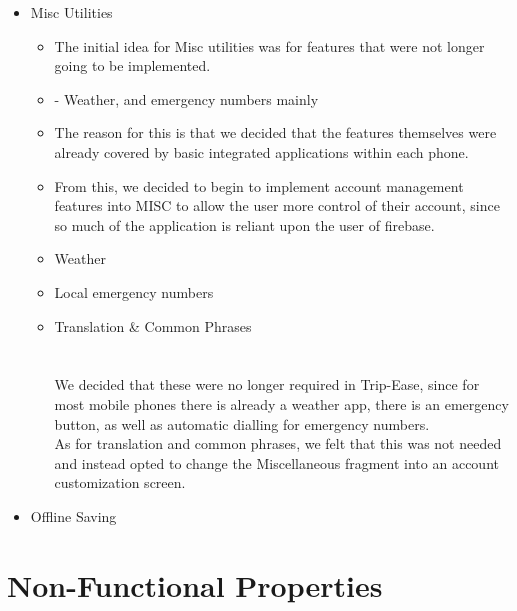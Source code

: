 \documentclass[12pt]{article}
\begin{document}
\begin{itemize}
		\item{Misc Utilities}
		\begin{itemize}
			\item 	The initial idea for Misc utilities was for features that were not longer going to be implemented.
			\item 	- Weather, and emergency numbers mainly
			\item 	The reason for this is that we decided that the features themselves were already covered by basic integrated applications within each phone.
			\item 	From this, we decided to begin to implement account management features into MISC to allow the user more control of their account, since so much of the	application is reliant upon the user of firebase.
		\end{itemize}



		\begin{itemize}
			\item Weather
			\item Local emergency numbers
			\item Translation \& Common Phrases
			\\
			\\
			\\
			We decided that these were no longer required in Trip-Ease, since for most mobile phones there is already a weather app, there is an emergency button, as well as automatic dialling for emergency numbers.\\
			As for translation and common phrases, we felt that this was not needed and instead opted to change the Miscellaneous fragment into an account customization screen.
		\end{itemize}

		\item{Offline Saving}

	\end{itemize}

	\section*{Non-Functional Properties}
\end{document}
